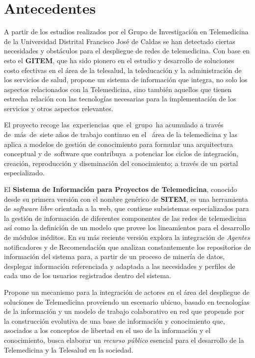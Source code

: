 \chapter{Antecedentes}
A partir de los estudios realizados por el Grupo de Investigación en Telemedicina de la Universidad Distrital Francisco José de Caldas se han detectado ciertas necesidades y obstáculos para el despliegue de redes de telemedicina. Con base en esto el \textbf{GITEM}, que ha sido pionero en el estudio y desarrollo de soluciones costo efectivas en el área de la telesalud, la teleducación y la administración de los servicios de salud, propone un sistema de información que integra, no solo los aspectos relacionados con la Telemedicina, sino también aquellos que tienen estrecha relación con las tecnologías necesarias para la implementación de los servicios y otros aspectos relevantes.

El proyecto recoge las experiencias que el grupo ha acumulado a través de más de siete años de trabajo continuo en el  área de la telemedicina y las aplica a modelos de gestión de conocimiento para formular una arquitectura conceptual y de software que contribuya a potenciar los ciclos de integración, creación, reproducción y diseminación del conocimiento; a través de un portal especializado.

El \textbf{Sistema de Información para Proyectos de Telemedicina}, conocido desde su primera versión con el nombre genérico de \textbf{SITEM}, es una herramienta de \textit{software libre} orientada a la web, que contiene subsistemas especializados para la gestión de información de diferentes componentes de las redes de telemedicina así como la definición de un modelo que provee los lineamientos para el desarrollo de módulos inéditos. En su más reciente versión explora la integración de \textit{Agentes} notificadores y de Recomendación que analizan constantemente los repositorios de información del sistema para, a partir de un proceso de minería de datos, desplegar información referenciada y adaptada a las necesidades y perfiles de cada uno de los usuarios registrados dentro del sistema. 

Propone un mecanismo para la integración de actores en el área del despliegue de soluciones de Telemedicina proveiendo un escenario ubicuo, basado en tecnologías de la información y un modelo de trabajo colaborativo en red que propende por la construcción evolutiva de una base de información y conocimiento que, asociados a los conceptos de libertad en el uso de la información y el conocimiento, busca elaborar un \textit{recurso público} esencial para el desarrollo de la Telemedicina y la Telesalud en la sociedad.

